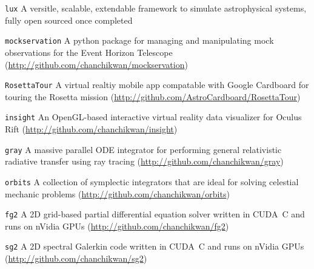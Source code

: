 \begin{Tlist}

\item[\texttt{lux}] A versitle, scalable, extendable framework to
  simulate astrophysical systems, fully open sourced once completed

\item[\texttt{mockservation}] A python package for managing and
  manipulating mock observations for the Event Horizon Telescope
  (\url{http://github.com/chanchikwan/mockservation})

\item[\texttt{RosettaTour}] A virtual realtiy mobile app compatable
  with Google Cardboard for touring the Rosetta mission
  (\url{http://github.com/AstroCardboard/RosettaTour})

\item[\texttt{insight}] An OpenGL-based interactive virtual reality
  data visualizer for Oculus Rift
  (\url{http://github.com/chanchikwan/insight})

\item[\texttt{gray}] A massive parallel ODE integrator for performing
  general relativistic radiative transfer using ray tracing
  (\url{http://github.com/chanchikwan/gray})

\item[\texttt{orbits}] A collection of symplectic integrators that are
  ideal for solving celestial mechanic problems
  (\url{http://github.com/chanchikwan/orbits})

\item[\texttt{fg2}] A 2D grid-based partial differential equation
  solver written in CUDA~C and runs on nVidia GPUs
  (\url{http://github.com/chanchikwan/fg2})

\item[\texttt{sg2}] A 2D spectral Galerkin code written in CUDA~C and
  runs on nVidia GPUs (\url{http://github.com/chanchikwan/sg2})

\end{Tlist}
